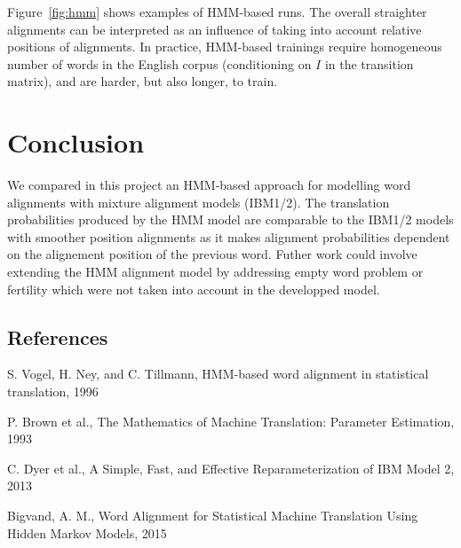 \documentclass[final]{beamer}
\begin{document}
\begin{frame}[t]
\begin{multicols}{3}
Figure~\ref{fig:hmm} shows examples of HMM-based runs. The overall straighter alignments can be interpreted as an influence of taking into account relative positions of alignments. In practice, HMM-based trainings require homogeneous number of words in the English corpus (conditioning on $I$ in the transition matrix), and are harder, but also longer, to train. 

\section{Conclusion}

We compared in this project an HMM-based approach for modelling word alignments with mixture alignment models (IBM1/2). The translation probabilities produced by the HMM model are comparable to the IBM1/2 models with smoother position alignments as it makes alignment probabilities dependent on the alignement position of the previous word. Futher work could involve extending the HMM alignment model by addressing empty word problem or fertility which were not taken into account in the developped model.



\subsection{References}

\begin{thebibliography}{99}

 S. Vogel, H. Ney, and C. Tillmann, HMM-based word alignment in statistical translation, 1996

 P. Brown et al., The Mathematics of Machine Translation: Parameter Estimation, 1993

 C. Dyer et al., A Simple, Fast, and Effective Reparameterization of IBM Model 2, 2013

 Bigvand, A. M., Word Alignment for Statistical Machine Translation Using Hidden Markov Models, 2015

\end{thebibliography}

\end{multicols}

\end{frame}
\end{document}
